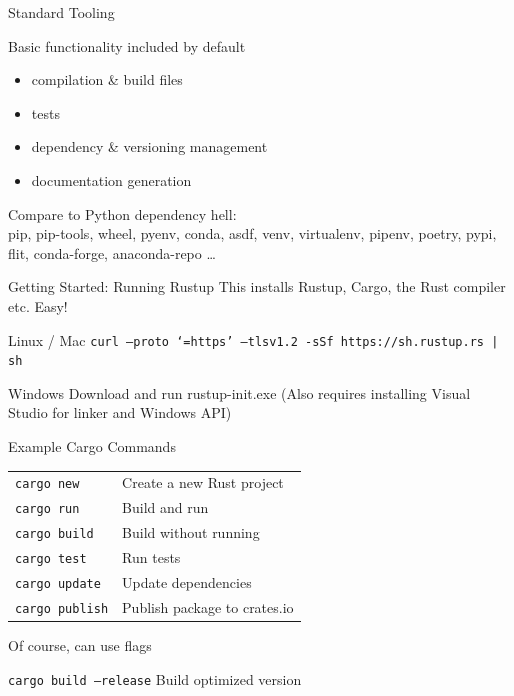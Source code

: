 \documentclass{beamer}
\begin{document}
\begin{frame}{Standard Tooling} 
\vspace{-3em}
\begin{block}
{Basic functionality included by default}
\begin{itemize} [label=$\bullet$] 
\item compilation \& build files
\item tests
\item dependency \& versioning management
\item documentation generation
\end{itemize}
\end{block}
Compare to Python dependency hell: \\
pip, pip-tools, wheel, pyenv, conda, asdf, venv, virtualenv, pipenv, poetry, pypi, flit, conda-forge, anaconda-repo \ldots
\end{frame} 

\begin{frame}{Getting Started: Running Rustup} 
This installs Rustup, Cargo, the Rust compiler etc. Easy! 
\begin{block}{Linux / Mac}
\texttt{curl --proto `=https' --tlsv1.2 -sSf https://sh.rustup.rs | sh}
\end{block}
\begin{block}{Windows}
Download and run rustup-init.exe (Also requires installing Visual Studio for linker and Windows API)
\end{block}
\end{frame}

\begin{frame}{Example Cargo Commands} 
\begin{block}{}
\begin{tabular}{@{}l l@{}}
\texttt{cargo new}     & Create a new Rust project \\
\texttt{cargo run}     & Build and run \\
\texttt{cargo build}     & Build without running \\
\texttt{cargo test}    & Run tests \\
\texttt{cargo update}  & Update dependencies\\
\texttt{cargo publish} & Publish package to crates.io \\
\end{tabular}
\end{block}

Of course, can use flags 
\begin{block}{}
\texttt{cargo build --release} \hspace{3em} Build optimized version
\end{block}
\end{frame}
\end{document}
